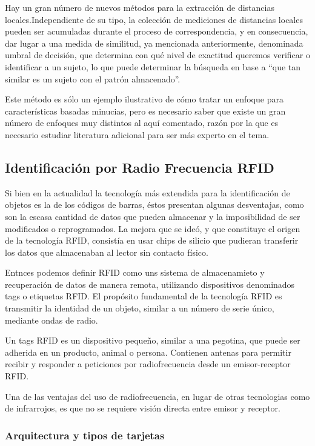 Hay un gran número de nuevos métodos para la extracción de distancias locales.Independiente de su tipo, la colección de mediciones de distancias locales pueden ser acumuladas durante el proceso de correspondencia, y en consecuencia, dar lugar a una medida de similitud, ya mencionada anteriormente, denominada umbral de decisión, que determina con qué nivel de exactitud queremos verificar o identificar a un sujeto, lo que puede determinar la búsqueda en base a “que tan similar es un sujeto con el patrón almacenado”.


Este método es sólo un ejemplo ilustrativo de cómo tratar un enfoque para características basadas minucias, pero es necesario saber que existe un gran número de enfoques muy distintos al aquí comentado, razón por la que es necesario estudiar literatura adicional para ser más experto en el tema.


\subsection{Identificación por Radio Frecuencia RFID}

Si bien en la actualidad la tecnología más extendida para la identificación de objetos es la de los códigos de barras, éstos presentan algunas desventajas, como son la escasa cantidad de datos que pueden almacenar y la
imposibilidad de ser modificados o reprogramados. La mejora que se ideó, y que constituye el origen de la tecnología RFID, consistía en usar chips de silicio que pudieran transferir los datos que almacenaban al lector sin contacto físico.

Entnces podemos definir RFID como  uns  sistema de  almacenamieto  y  recuperación  de  datos  de  manera remota, utilizando dispositivos denominados tags o etiquetas RFID. El propósito fundamental de la tecnología RFID es transmitir la identidad de un objeto, similar a un número de serie único, mediante ondas de radio.

Un tags RFID es un dispositivo pequeño, similar a una  pegotina, que puede ser adherida en un producto, animal o persona. Contienen antenas para permitir recibir y responder a peticiones por radiofrecuencia desde un emisor-receptor RFID.


Una de las ventajas del uso de radiofrecuencia, en lugar de otras tecnologias como de infrarrojos, es que no se requiere visión directa entre emisor y receptor.

\subsubsection{Arquitectura y tipos de tarjetas}


